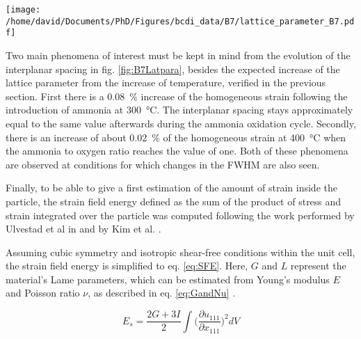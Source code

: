 \begin{SCfigure}
    \centering
    \texttt{[image: /home/david/Documents/PhD/Figures/bcdi\_data/B7/lattice\_parameter\_B7.pdf]}
    \caption{
        Evolution of the interplanar spacing $d_{111}$ and homogeneous strain $\epsilon_{111, homo}$ for particle B as a function of the ammonia to oxygen ratio.
        The reference for the computation of $\epsilon_{111, homo}$ was taken as the mean value at \qty{25}{\degreeCelsius}.
        The reproduction of measurements at fixed conditions yield multiple data points, lines at \qty{300}{\degreeCelsius} and \qty{400}{\degreeCelsius} link the data points in the order of the measurements.
    }
    \label{fig:B7Latpara}
\end{SCfigure}

Two main phenomena of interest must be kept in mind from the evolution of the interplanar spacing in fig. \ref{fig:B7Latpara}, besides the expected increase of the lattice parameter from the increase of temperature, verified in the previous section.
First there is a \qty{0.08}{\percent} increase of the homogeneous strain following the introduction of ammonia at \qty{300}{\degreeCelsius}.
The interplanar spacing stays approximately equal to the same value afterwards during the ammonia oxidation cycle.
Secondly, there is an increase of about \qty{0.02}{\percent} of the homogeneous strain at \qty{400}{\degreeCelsius} when the ammonia to oxygen ratio reaches the value of one.
Both of these phenomena are observed at conditions for which changes in the FWHM are also seen.

Finally, to be able to give a first estimation of the amount of strain inside the particle, the strain field energy defined as the sum of the product of stress and strain integrated over the particle \parencite{Cahn1959} was computed following the work performed by Ulvestad et al in \cite*{Ulvestad2015a} and by Kim et al. \cite*{Kim2019}.

Assuming cubic symmetry and isotropic shear-free conditions within the unit cell, the strain field energy is simplified to eq. \ref{eq:SFE}.
Here, $G$ and $L$ represent the material's Lame parameters, which can be estimated from Young's modulus $E$ and Poisson ratio $\nu$, as described in eq. \ref{eq:GandNu} \parencite{Mavko2020}.

\begin{equation}
    E_s = \frac{2G + 3I}{2} \int \Big( \frac{\partial u_{111}}{\partial x_{111}}\Big)^2 dV
    \label{eq:SFE}
\end{equation}

